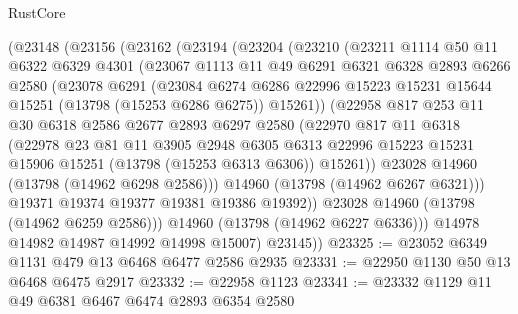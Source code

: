 \begin{lexlean}{RustCore}
\begin{coremodule}
    (@23148
      (@23156
        (@23162
          (@23194
            (@23204
              (@23210
                (@23211
                  @1114
                  @50
                  @11
                  @6322
                  @6329
                  @4301
                  (@23067
                    @1113
                    @11
                    @49
                    @6291
                    @6321
                    @6328
                    @2893
                    @6266
                    @2580
                    (@23078
                      @6291
                      (@23084
                        @6274
                        @6286
                        @22996
                        @15223
                        @15231
                        @15644
                        @15251
                        (@13798 (@15253 @6286 @6275))
                        @15261))
                    (@22958
                      @817
                      @253
                      @11
                      @30
                      @6318
                      @2586
                      @2677
                      @2893
                      @6297
                      @2580
                      (@22970
                        @817
                        @11
                        @6318
                        (@22978
                          @23
                          @81
                          @11
                          @3905
                          @2948
                          @6305
                          @6313
                          @22996
                          @15223
                          @15231
                          @15906
                          @15251
                          (@13798 (@15253 @6313 @6306))
                          @15261))
                      @23028
                      @14960
                      (@13798 (@14962 @6298 @2586)))
                    @14960
                    (@13798 (@14962 @6267 @6321)))
                  @19371
                  @19374
                  @19377
                  @19381
                  @19386
                  @19392))
              @23028
              @14960
              (@13798 (@14962 @6259 @2586)))
            @14960
            (@13798 (@14962 @6227 @6336)))
          @14978
          @14982
          @14987
          @14992
          @14998
          @15007)
        @23145))
@23325 := @23052 @6349 @1131 @479 @13 @6468 @6477 @2586 @2935
@23331 := @22950 @1130 @50 @13 @6468 @6475 @2917
@23332 := @22958 @1123
@23341 := @23332 @1129 @11 @49 @6381 @6467 @6474 @2893 @6354 @2580

\end{coremodule}
\end{lexlean}
